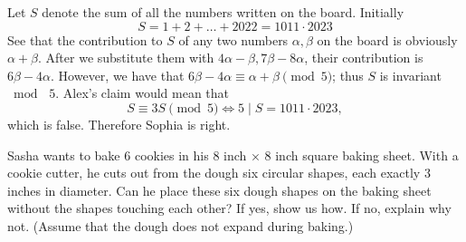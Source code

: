 \begin{solution}
    Let $S$ denote the sum of all the numbers written on the board. Initially 
    $$S = 1 + 2 + \ldots + 2022 = 1011 \cdot 2023$$
    See that the contribution to $S$ of any two numbers $\alpha, \beta$ on the board is obviously $\alpha + \beta$. After we substitute them with $4 \alpha - \beta, 7 \beta - 8 \alpha$, their contribution is $6 \beta - 4 \alpha$. 
    However, we have that $6 \beta - 4 \alpha \equiv \alpha + \beta \pmod{5}$; thus $S$ is invariant $\bmod{\hspace{5pt} 5}$. Alex's claim would mean that 
    $$S \equiv 3S \pmod{5} \iff 5 \mid S = 1011 \cdot 2023,$$ 
    which is false. Therefore Sophia is right.
\end{solution}

\begin{problem}[C][6][BAMO 2024/2]
    Sasha wants to bake 6 cookies in his 8 inch × 8 inch square baking sheet. With a cookie cutter, he cuts out from the dough six circular shapes, each exactly 3 inches in diameter. Can he place these six dough shapes on the baking sheet without the shapes touching each other? If yes, show us how. If no, explain why not. (Assume that the dough does not expand during baking.)
\end{problem}


